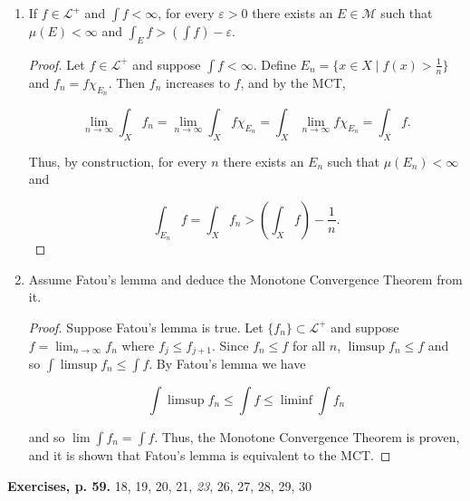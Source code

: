 \documentclass[11pt,oneside,english]{amsart}
\theoremstyle{definition}
\newcommand{\lom}[2]{\lim_{{#1}\rightarrow{#2}}}
\newcommand{\ve}{\varepsilon}
\newcommand{\MC}[1]{\mathcal{#1}}
\begin{document}
\begin{enumerate}
\item If $f\in \MC{L}^+$ and $\int f<\infty$, for every $\ve>0$ there exists an $E\in \MC{M}$ such that $\mu(E)<\infty$ and $\int_Ef>(\int f)-\ve$.

\begin{proof}
Let  $f\in \MC{L}^+$ and suppose  $\int f<\infty$. Define $E_n=\{x\in X \mid f(x)>\frac{1}{n}\}$ and $f_n=f\chi_{E_n}$. Then $f_n$ increases to $f$, and by the MCT, 

\[
\lom{n}{\infty}\int_X f_n=\lom{n}{\infty}\int_X f\chi_{E_n}=\int_X \lom{n}{\infty} f\chi_{E_n}=\int_X f.
\]

Thus, by construction, for every $n$ there exists an $E_n$ such that $\mu(E_n)<\infty$ and 

\[
\int_{E_n} f=\int_Xf_n> \left(\int_X f\right)-\frac{1}{n}.
\]
\end{proof}

\item Assume Fatou's lemma and deduce the Monotone Convergence Theorem from it. 

\begin{proof}
Suppose Fatou's lemma is true. Let $\{f_n\}\subset\MC{L}^+$ and suppose $f=\lom{n}{\infty} f_n$ where $f_j\leq f_{j+1}$. Since $f_n\leq f$ for all $n$, $\limsup f_n\leq f$ and so $\int\limsup f_n\leq \int f$. By Fatou's lemma we have

\[
\int\limsup f_n\leq \int f\leq\liminf\int f_n
\]

and so $\lim\int f_n=\int f$. Thus, the Monotone Convergence Theorem is proven, and it is shown that Fatou's lemma is equivalent to the MCT.
\end{proof}
\end{enumerate}

\pagebreak

\textbf{Exercises, p. 59.} 18, 19, 20, 21, \textit{23}, 26, 27, 28, 29, 30
\end{document}
